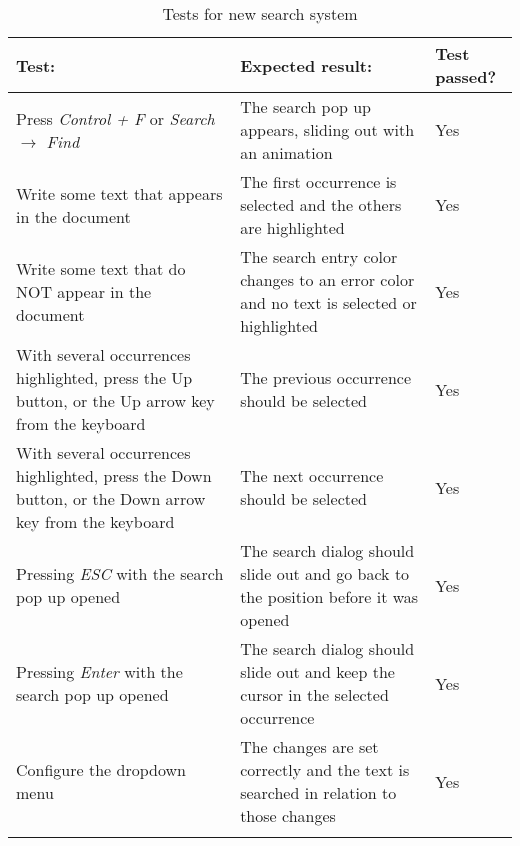 \begin{table}[H]
  \begin{center}
    \begin{tabularx}{\textwidth}{|X|X|l|}
      \firsthline
      \textbf{Test:} & \textbf{Expected result:} & \textbf{Test passed?} \\
      \hline
      Press \emph{Control + F} or \emph{Search $\to$ Find} & The search pop up appears, sliding out with an animation & Yes \\
      \hline
      Write some text that appears in the document & The first occurrence is selected and the others are highlighted & Yes \\
      \hline
      Write some text that do NOT appear in the document & The search entry color changes to an error color and no text is selected or highlighted & Yes \\
      \hline
      With several occurrences highlighted, press the Up button, or the Up arrow key from the keyboard & The previous occurrence should be selected & Yes \\
      \hline
      With several occurrences highlighted, press the Down button, or the Down arrow key from the keyboard & The next occurrence should be selected & Yes \\
      \hline
      Pressing \emph{ESC} with the search pop up opened & The search dialog should slide out and go back to the position before it was opened & Yes \\
      \hline
      Pressing \emph{Enter} with the search pop up opened & The search dialog should slide out and keep the cursor in the selected occurrence & Yes \\
      \hline
      Configure the dropdown menu & The changes are set correctly and the text is searched in relation to those changes & Yes \\
      \lasthline
    \end{tabularx}
    \caption{Tests for new search system}
  \end{center}
\end{table}
